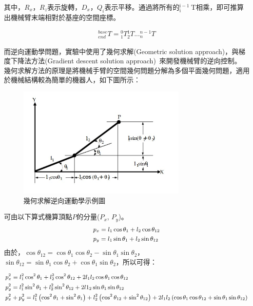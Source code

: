 \documentclass[class=NCU_thesis, crop=false]{standalone}
\begin{document}
其中，$R_x$，$R_z$表示旋轉，$D_x$，$Q_i$表示平移。通過將所有的${ }_{\mathrm{i}}^{\mathrm{i}-1} \mathrm{~T}$相乘，即可推算出機械臂末端相對於基座的空間座標。


\begin{align}
{ }_{end}^{base} T={ }_{1}^{0}T { }_{2}^{1}T ... { }_{n}^{n-1}T
\nonumber
\end{align}

而逆向運動學問題，實驗中使用了幾何求解(Geometric solution approach)，與梯度下降法方法(Gradient descent solution approach)~\cite{Singh2017DevelopmentOA}來開發機械臂的逆向控制。\\

幾何求解方法的原理是將機械手臂的空間幾何問題分解為多個平面幾何問題，適用於機械結構較為簡單的機器人，如下圖所示：

\begin{figure}[htbp]
    \centering
    \includegraphics[width=0.75\textwidth]{figures/IK.jpg}
\caption{幾何求解逆向運動學示例圖~\cite{kucuk2006robot}}
\end{figure}

可由以下算式機算頂點$P$的分量($P_{x}$, $P_{y}$)。
$$
\begin{small}
\begin{aligned}
& p_{x}=l_1 \cos \theta_1+l_2 \cos \theta_{12} \\
& p_{y}=l_1 \sin \theta_1+l_2 \sin \theta_{12}
\end{aligned}
\end{small}
$$
由於，$\cos \theta_{12}=\cos \theta_{1} \cos \theta_{2}-\sin \theta_{1} \sin \theta_{2}$，$
\sin \theta_{12}=\sin \theta_{1} \cos \theta_{2}+\cos \theta_{1} \sin \theta_{2}$，所以可得：

$$
\begin{small}
\begin{aligned}
& p_{x}^2=l_1^2 \cos^2 \theta_1+l_2^2 \cos^2 \theta_{12}+2 l_1 l_2 \cos \theta_1 \cos \theta_{12} \\
& p_{y}^2=l_1^2 \sin^2 \theta_1 + l_2^2 \sin^2 \theta_{12}+2 l1_2 \sin \theta_1 \sin \theta_{12} \\
& p_{x}^2+p_{y}^2=l_1^2\left(\cos^2 \theta_1+\sin^2 \theta_1\right)+l_2^2\left(\cos^2 \theta_{12}+\sin^2 \theta_{12}\right)+2l_1 l_2\left(\cos \theta_1 \cos \theta_{12}+\sin \theta_1 \sin \theta_{12}\right)
\end{aligned}
\end{small}
$$
\end{document}
